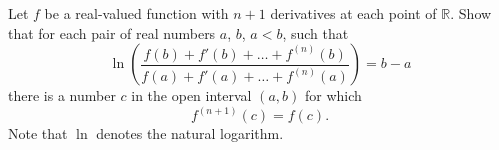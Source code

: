 \documentclass{article}
\begin{document}
	\setlength{\parindent}{0pt}
	Let $f$ be a real-valued function with $n + 1$ derivatives at each point of	$\mathbb{R}$. Show that for each pair of real numbers $a$, $b$, $a < b$, such that
	$$\ln\left(\frac{f(b) + f'(b) + \dots + f^{(n)}(b)}{f(a) + f'(a) +\dots + f^{(n)}(a)}\right)=b - a$$
	there is a number $c$ in the open interval $(a, b)$ for which	$$f^{(n+1)}(c) = f(c).$$
	Note that $\ln$ denotes the natural logarithm.
\end{document}

